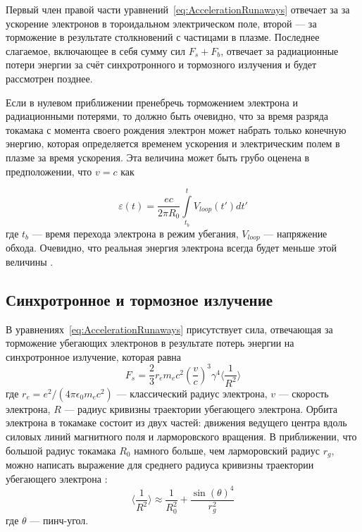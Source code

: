 Первый член правой части уравнений~\ref{eq:AccelerationRunaways} отвечает за за ускорение электронов в тороидальном электрическом поле, второй --- за торможение в результате столкновений с частицами в плазме. Последнее слагаемое, включающее в себя сумму сил $F_s + F_b$, отвечает за радиационные потери энергии за счёт синхротронного и тормозного излучения и будет рассмотрен позднее.

Если в нулевом приближении пренебречь торможением электрона и радиационными потерями, то должно быть очевидно, что за время разряда токамака с момента своего рождения электрон может набрать только конечную энергию, которая определяется временем ускорения и электрическим полем в плазме за время ускорения. Эта величина может быть грубо оценена в предположении, что $v = c$ как

\begin{equation}
  \label{eq:MaxRunawayEnergyLimit}
  \varepsilon(t) = \frac{ e c }{ 2 \pi R_0 } \int \limits_{t_b}^{t} V_{loop}(t') d t'
\end{equation}
где $t_b$ --- время перехода электрона в режим убегания, $V_{loop}$ --- напряжение обхода. Очевидно, что реальная энергия электрона всегда будет меньше этой величины \cite{Shevelev2019th}.


\subsection{Синхротронное и тормозное излучение}

В уравнениях~\ref{eq:AccelerationRunaways} присутствует сила, отвечающая за торможение убегающих электронов в результате потерь энергии на синхротронное излучение, которая равна \cite{MartinSolis1998, MartinSolis1999} 
\begin{equation*}
  F_s = \frac{2}{3} r_e m_e c^2 \left( \frac{v}{c} \right)^3 \gamma^4 \langle \frac{1}{R^2} \rangle
\end{equation*}
где $r_e = e^2/(4 \pi \epsilon_0 m_e c^2 )$ --- классический радиус электрона, $v$ --- скорость электрона, $R$ --- радиус кривизны траектории убегающего электрона. Орбита электрона в токамаке 
состоит из двух частей: движения ведущего центра вдоль силовых линий магнитного поля и ларморовского вращения. В приближении, что большой радиус токамака $R_0$ намного больше, чем ларморовский радиус $r_g$, можно написать выражение для среднего радиуса кривизны траектории убегающего электрона \cite{MartinSolis1998}:
\begin{equation*}
  \langle \frac{1}{R^2} \rangle \approx \frac{1}{R_0^2} + \frac{ \sin(\theta)^4 }{r_g^2}
\end{equation*}
где $\theta$ --- пинч-угол. 

